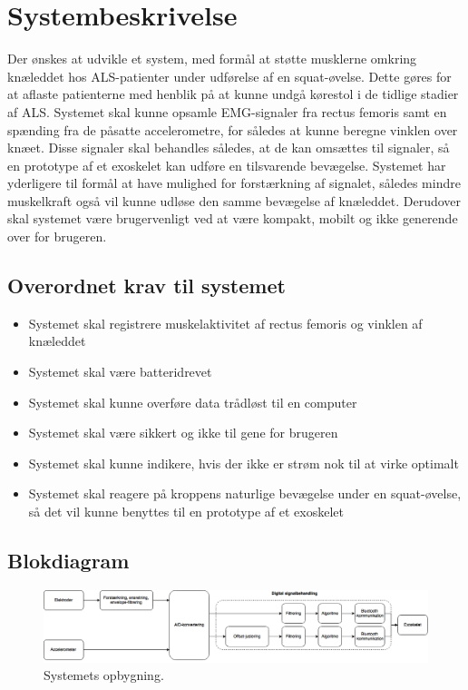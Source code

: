 \section{Systembeskrivelse}
Der ønskes at udvikle et system, med formål at støtte musklerne omkring knæleddet hos ALS-patienter under udførelse af en squat-øvelse. Dette gøres for at aflaste patienterne med henblik på at kunne undgå kørestol i de tidlige stadier af ALS. 
Systemet skal kunne opsamle EMG-signaler fra rectus femoris samt en spænding fra de påsatte accelerometre, for således at kunne beregne vinklen over knæet. Disse signaler skal behandles således, at de kan omsættes til signaler, så en prototype af et exoskelet kan udføre en tilsvarende bevægelse. 
Systemet har yderligere til formål at have mulighed for forstærkning af signalet, således mindre muskelkraft også vil kunne udløse den samme bevægelse af knæleddet. 
Derudover skal systemet være brugervenligt ved at være kompakt, mobilt og ikke generende over for brugeren.

\subsection{Overordnet krav til systemet}  \label{sec:overordnet_krav}
\begin{itemize}
\item Systemet skal registrere muskelaktivitet af rectus femoris og vinklen af knæleddet
\item Systemet skal være batteridrevet
\item Systemet skal kunne overføre data trådløst til en computer
\item Systemet skal være sikkert og ikke til gene for brugeren 
\item Systemet skal kunne indikere, hvis der ikke er strøm nok til at virke optimalt
\item Systemet skal reagere på kroppens naturlige bevægelse under en squat-øvelse, så det vil kunne benyttes til en prototype af et exoskelet
\end{itemize}


\subsection{Blokdiagram} \label{sec:blokdiagram} 
\begin{figure}[H]
\centering
\includegraphics[width=1\textwidth]{figures/blokdiagram.png}
\caption{Systemets opbygning.}
\label{fig:blokdiagram}
\end{figure}

